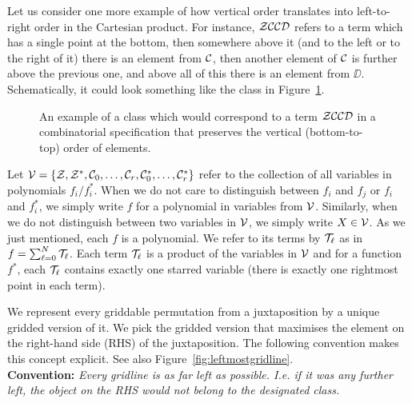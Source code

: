 \documentclass[12pt, a4paper, twoside]{report}
\begin{document}
Let us consider one more example of how vertical order translates into left-to-right order in the Cartesian product. For instance, $\mathcal{Z}\mathcal{C}\mathcal{C}\mathcal{D}$ refers to a term which has a single point at the bottom, then somewhere above it (and to the left or to the right of it) there is an element from $\mathcal{C}$, then another element of $\mathcal{C}$ is further above the previous one, and above all of this there is an element from $\DD$. Schematically, it could look something like the class in Figure~\ref{fig:order}.

\begin{figure}[ht]
  \centering
  \caption{An example of a class which would correspond to a term $\mathcal{Z}\mathcal{C}\mathcal{C}\mathcal{D}$ in a combinatorial specification that preserves the vertical (bottom-to-top) order of elements.}
  \label{fig:order}
\end{figure}

Let $\mathcal{V} = \{\mathcal{Z},\mathcal{Z}^*,\mathcal{C}_0,\ldots,\mathcal{C}_r,\mathcal{C}^*_0,\ldots,\mathcal{C}_r^*\}$ refer to the collection of all variables in polynomials $f_i/f_i^*$. When we do not care to distinguish between $f_i$ and $f_j$ or $f_i$ and $f_i^*$, we simply write $f$ for a polynomial in variables from $\mathcal{V}$. Similarly, when we do not distinguish between two variables in $\mathcal{V}$, we simply write $X \in \mathcal{V}$. As we just mentioned, each $f$ is a polynomial. We refer to its terms by $\mathcal{T}_\ell$ as in $f = \sum_{\ell=0}^N\mathcal{T}_\ell$. Each term $\mathcal{T}_\ell$ is a product of the variables in $\mathcal{V}$ and for a function $f^*$, each $\mathcal{T}_\ell$ contains exactly one starred variable (there is exactly one rightmost point in each term). 

We represent every griddable permutation from a juxtaposition by a unique gridded version of it. We pick the gridded version that maximises the element on the right-hand side (RHS) of the juxtaposition. The following convention makes this concept explicit. See also Figure~\ref{fig:leftmostgridline}.\\

\noindent\textbf{Convention:} \emph{Every gridline is as far left as possible. I.e. if it was any further left, the object on the RHS would not belong to the designated class.}\\
\end{document}
